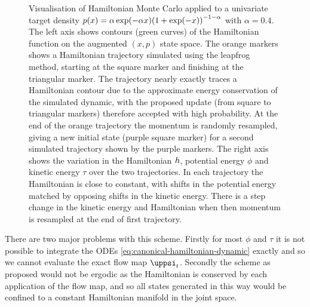 \begin{figure}[t]
\centering
{}
\vspace{-6mm}
\caption[Visualisation of Hamiltonian Monte Carlo.]{Visualisation of Hamiltonian Monte Carlo applied to a univariate target density $\tgtdens(x) = \alpha\exp(-\alpha x) \lpa 1 + \exp(-x)\rpa^{-1-\alpha}$ with $\alpha = 0.4$. The left axis shows contours (green curves) of the Hamiltonian function on the augmented $(x,p)$ state space. The orange markers shows a Hamiltonian trajectory simulated using the leapfrog method, starting at the square marker and finishing at the triangular marker. The trajectory nearly exactly traces a Hamiltonian contour due to the approximate energy conservation of the simulated dynamic, with the proposed update (from square to triangular markers) therefore accepted with high probability. At the end of the orange trajectory the momentum is randomly resampled, giving a new initial state (purple square marker) for a second simulated trajectory shown by the purple markers. The right axis shows the variation in the Hamiltonian $h$, potential energy $\phi$ and kinetic energy $\tau$ over the two trajectories. In each trajectory the Hamiltonian is close to constant, with shifts in the potential energy matched by opposing shifts in the kinetic energy. There is a step change in the kinetic energy and Hamiltonian when then momentum is resampled at the end of first trajectory.}
\label{fig:hamiltonian-monte-carlo}
\end{figure}

There are two major problems with this scheme. Firstly for most $\phi$ and $\tau$ it is not possible to integrate the \acp{ODE} \eqref{eq:canonical-hamiltonian-dynamic} exactly and so we cannot evaluate the exact flow map $\flowmap_t$. Secondly the scheme as proposed would not be ergodic as the Hamiltonian is conserved by each application of the flow map, and so all states generated in this way would be confined to a constant Hamiltonian manifold in the joint space.

